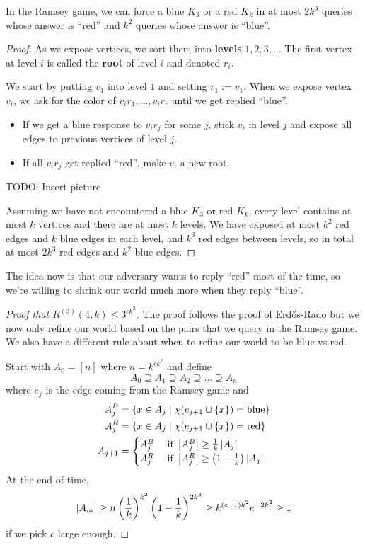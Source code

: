 \documentclass{article}
\begin{document}
\begin{lem}
  In the Ramsey game, we can force a blue $K_3$ or a red $K_k$ in at most $2k^3$ queries whose answer is ``red'' and $k^2$ queries whose answer is ``blue''.
\end{lem}
\begin{proof}
  As we expose vertices, we sort them into {\bf levels} $1, 2, 3, \dots$ The first vertex at level $i$ is called the {\bf root} of level $i$ and denoted $r_i$.

  We start by putting $v_1$ into level $1$ and setting $r_1 := v_1$. When we expose vertex $v_i$, we ask for the color of $v_ir_1, \dots, v_ir_r$ until we get replied ``blue''.
  \begin{itemize}
    \item If we get a blue response to $v_ir_j$ for some $j$, stick $v_i$ in level $j$ and expose all edges to previous vertices of level $j$.
    \item If all $v_ir_j$ get replied ``red'', make $v_i$ a new root.
  \end{itemize}
  TODO: Insert picture

  Assuming we have not encountered a blue $K_3$ or red $K_k$, every level contains at most $k$ vertices and there are at most $k$ levels. We have exposed at most $k^2$ red edges and $k$ blue edges in each level, and $k^3$ red edges between levels, so in total at most $2k^3$ red edges and $k^2$ blue edges.
\end{proof}

The idea now is that our adversary wants to reply ``red'' most of the time, so we're willing to shrink our world much more when they reply ``blue''.

\begin{proof}[Proof that $R^{(3)}(4, k) \le 3^{ck^2}$]
  The proof follows the proof of Erd\H os-Rado but we now only refine our world based on the pairs that we query in the Ramsey game. We also have a different rule about when to refine our world to be blue vs red.

  Start with $A_0 = [n]$ where $n = k^{ck^2}$ and define
  $$A_0 \supseteq A_1 \supseteq A_2 \supseteq \dots \supseteq A_n$$
  where $e_j$ is the edge coming from the Ramsey game and
  \begin{align*}
    A_j^B & = \{x \in A_j \mid \chi(e_{j + 1} \cup \{x\}) = \text{blue}\} \\
    A_j^R & = \{x \in A_j \mid \chi(e_{j + 1} \cup \{x\}) = \text{red}\} \\
    A_{j + 1} & =
    \begin{cases}
      A_j^B & \text{ if } \left\lvert A_j^B\right\rvert \ge \frac 1k \left\lvert A_j\right\rvert \\
      A_j^R & \text{ if } \left\lvert A_j^R\right\rvert \ge \left(1 - \frac 1k\right) \left\lvert A_j\right\rvert
    \end{cases}
  \end{align*}
  At the end of time,
  $$\left\lvert A_m\right\rvert \ge n\left(\frac 1k\right)^{k^2}\left(1 - \frac 1k\right)^{2k^3} \ge k^{(c - 1)k^2}e^{-2k^2} \ge 1$$
  if we pick $c$ large enough.
\end{proof}
\end{document}
